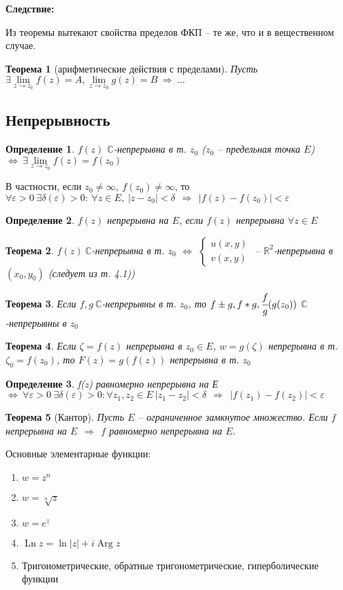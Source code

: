 \documentclass[draft]{article}
\newcommand{\then}{\ \Rightarrow\ }
\newcommand{\R}{\mathbb{R}}
\renewcommand{\C}{\mathbb{C}}
\newcommand{\mlim}[1]{\underset{#1}{\lim}}
\newcommand{\LRA}{\Leftrightarrow}
\newcommand{\epsdelta}{\forall \e>0\ \exists \delta(\e)>0\colon}
\newcommand{\Ln}{\mathop{\mathrm{Ln}}\nolimits}
\newcommand{\Arg}{\mathop{\mathrm{Arg}}\nolimits}
\newcommand{\e}{\varepsilon}
\newcommand{\sys}[1]{\left\{\begin{matrix}#1\end{matrix}\right.}
\newcommand{\opr}[1]{\begin{opred}#1\end{opred}}
\newtheorem*{theor}{Теорема}
\newtheorem*{opred}{Определение}
\theoremstyle{remark}
\begin{document}
{\bfseries Следствие:}

Из теоремы вытекают свойства пределов ФКП -- те же, что и в вещественном случае.

\begin{theor}[арифметические действия с пределами]
Пусть $\exists \mlim{z\to z_0}f(z)=A, \mlim{z\to z_0}g(z)=B \then \ldots$
\end{theor}

\subsection{Непрерывность}

\opr{$f(z)$ $\C$-непрерывна в т. $z_0$ ($z_0$ -- предельная точка $E$) $\LRA\ \exists \mlim{z\to z_0}f(z)=f(z_0)$}

В частности, если $z_0\neq\infty,\ f(z_0)\neq\infty$, то $\epsdelta\ \forall z\in E,\ |z-z_0|<\delta\ \then\ |f(z)-f(z_0)|<\e$

\opr{$f(z)$ непрерывна на $E$, если $f(z)$ непрерывна $\forall z\in E$}

\begin{theor}
$f(z)\ \C$-непрерывна в т. $z_0$ $\LRA$ $\sys{u(x,y)\\v(x,y)}$ -- $\R^2$-непрерывна в $(x_0,y_0)$ (следует из т. 4.1))
\end{theor}

\begin{theor}
Если $f,g\ \C$-непрерывны в т. $z_0$, то $f\pm g, f*g, \cfrac fg (g(z_0))$ $\C$-непрерывны в $z_0$
\end{theor}

\begin{theor}
Если $\zeta=f(z)$ непрерывна в $z_0\in E$, $w=g(\zeta)$ непрерывна в т. $\zeta_0=f(z_0)$, то $F(z)=g(f(z))$ непрерывна в т. $z_0$
\end{theor}

\opr{f(z) равномерно непрерывна на Е $\LRA\ \epsdelta \forall z_1,z_2\in E\ |z_1-z_2|<\delta\ \then\ |f(z_1)-f(z_2)|<\e$}

\begin{theor}[Кантор]
Пусть $E$ -- ограниченное замкнутое множество. Если $f$ непрерывна на $E\ \then\ f$ равномерно непрерывна на $E$.
\end{theor}

Основные элементарные функции:
\begin{enumerate}
\item $w=z^n$
\item $w=\sqrt[n]{z}$
\item $w=e^z$
\item $\Ln z=\ln|z|+i\Arg z$
\item Тригонометрические, обратные тригонометрические, гиперболические функции
\end{enumerate}
\end{document}
